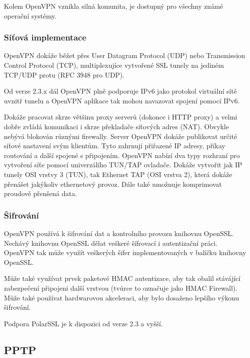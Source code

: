 \documentclass[thesis=B,czech]{FITthesis}[2012/06/26]
\begin{document}
        Kolem OpenVPN vznikla silná komunita, je dostupný pro všechny známé operační systémy.

      \subsubsection{Síťová implementace}

        OpenVPN dokáže běžet přes User Datagram Protocol (UDP) nebo Transmission Control Protocol (TCP), multiplexujíce vytvořené SSL tunely na jediném TCP/UDP protu\cite{openvpn_tls_mode_options} (RFC 3948 pro UDP).\cite{openvpn_udp}

        Od verze 2.3.x dál OpenVPN plně podporuje IPv6 jako protokol virtuální sítě uvnitř tunelu a OpenVPN aplikace tak mohou navazovat spojení pomocí IPv6.\cite{openvpn_community_wiki}

        Dokáže pracovat skrze většinu proxy serverů (dokonce i HTTP proxy) a velmi dobře zvládá komunikaci i skrze překladače síťových adres (NAT). Obvykle nebývá blokován různými firewally.
        Server OpenVPN dokáže publikovat určité síťové nastavení svým klientům. Tyto zahrnují přiřazené IP adresy, příkay routování a další spojené s připojením.
        OpenVPN nabízí dva typy rozhraní pro vytvoření síťe pomocí univerzálího TUN/TAP ovladače. Dokáže vytvořit jak IP tunely OSI vrstvy 3 (TUN), tak Ethernet TAP (OSI vrstva 2), která dokáže přenášet jakýkoliv ethernetový provoz. Dále také umožnuje komprimovat proudově přenšená data.

      \subsubsection{Šifrování}
        OpenVPN používá k šifrování dat a kontrolního provozu knihovnu OpenSSL. Nechávý knihovnu OpenSSL dělat veškeré šífrovací i autentizační práci. OpenVPN tak může využít veškerých šifer implementovaných v balíčku knihovny OpenSSL.

        Může také využívat prvek paketové HMAC autentizace, aby tak obalil stávájící zabezpečení připojeni další vrstvou (tvůrce to označuje jako HMAC Firewall). Může také používat hardwarovou akceleraci, aby bylo dosaženo lepšího výkonu šifrování.\cite{openvpn_enc_1}\cite{openvpn_enc_2}

        Podpora PolarSSL je k dispozici od verze 2.3 a vyšší.\cite{openvpn_enc_3}


    \subsection{PPTP}
\end{document}
